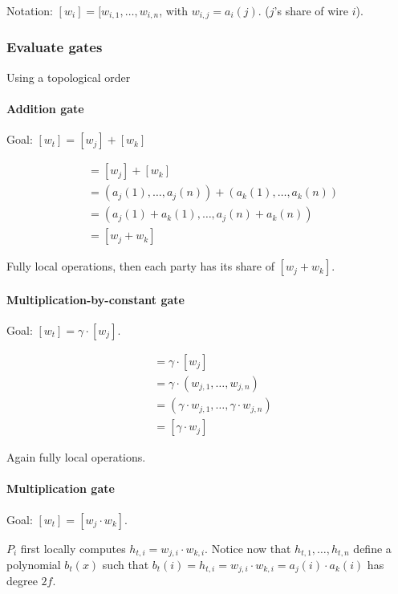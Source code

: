 Notation: $[w_i] = [w_{i, 1}, \ldots, w_{i, n}$, with $w_{i, j} = a_i(j)$.
($j$'s share of wire $i$).

\subsubsection{Evaluate gates}

Using a topological order

\paragraph{Addition gate}

Goal: $[w_t] = [w_j] + [w_k]$

\begin{align*}
  [w_t] & = [w_j] + [w_k] \\
        & = (a_j(1), \ldots, a_j(n)) + (a_k(1), \ldots, a_k(n)) \\
        & = (a_j(1) + a_k(1), \ldots, a_j(n) + a_k(n)) \\
        & = [w_j + w_k]
\end{align*}

Fully local operations, then each party has its share of $[w_j + w_k]$.

\paragraph{Multiplication-by-constant gate}

Goal: $[w_t] = \gamma \cdot [w_j]$.

\begin{align*}
  [w_t] & = \gamma \cdot [w_j] \\
        & = \gamma \cdot (w_{j, 1}, \ldots, w_{j, n}) \\
        & = (\gamma \cdot w_{j, 1}, \ldots, \gamma \cdot w_{j, n}) \\
        & = [\gamma \cdot w_j]
\end{align*}

Again fully local operations.

\paragraph{Multiplication gate}

Goal: $[w_t] = [w_j \cdot w_k]$.

$P_i$ first locally computes $h_{t,i} = w_{j, i} \cdot w_{k, i}$. Notice now
that $h_{t,1}, \ldots, h_{t, n}$ define a polynomial $b_t(x)$ such that $b_t(i)
= h_{t, i} = w_{j, i} \cdot w_{k, i} = a_j(i) \cdot a_k(i)$ has degree $2f$.

